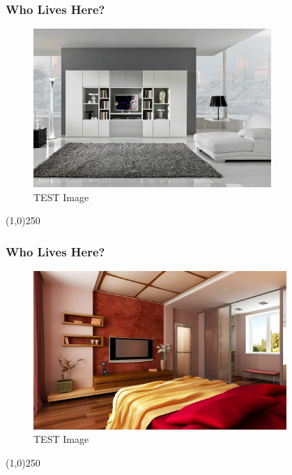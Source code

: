 \begin{frame}
\frametitle{Who Lives Here?}
\begin{figure}
	\centering
		\includegraphics[height=6cm]{img/D.jpg}
	\caption{TEST Image}
	\label{fig:lightingtypes}
\end{figure}
\end{frame}
\begin{center}\line(1,0){250}\end{center}



\begin{frame}
\frametitle{Who Lives Here?}
\begin{figure}
	\centering
		\includegraphics[height=6cm]{img/E.jpg}
	\caption{TEST Image}
	\label{fig:lightingtypes}
\end{figure}
\end{frame}
\begin{center}\line(1,0){250}\end{center}




